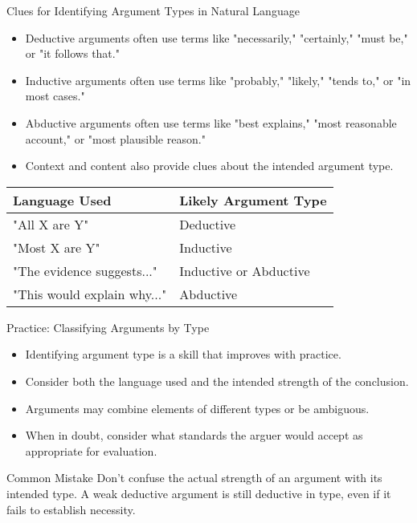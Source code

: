 \documentclass{beamer}
\begin{document}
\begin{frame}{Clues for Identifying Argument Types in Natural Language}
    \begin{itemize}
        \item Deductive arguments often use terms like "necessarily," "certainly," "must be," or "it follows that."
        \item Inductive arguments often use terms like "probably," "likely," "tends to," or "in most cases."
        \item Abductive arguments often use terms like "best explains," "most reasonable account," or "most plausible reason."
        \item Context and content also provide clues about the intended argument type.
    \end{itemize}
    
    \begin{table}
        \centering
        \begin{tabular}{|l|l|}
            \hline
            \textbf{Language Used} & \textbf{Likely Argument Type} \\
            \hline
            "All X are Y" & Deductive \\
            "Most X are Y" & Inductive \\
            "The evidence suggests..." & Inductive or Abductive \\
            "This would explain why..." & Abductive \\
            \hline
        \end{tabular}
    \end{table}
\end{frame}

\begin{frame}{Practice: Classifying Arguments by Type}
    \begin{itemize}
        \item Identifying argument type is a skill that improves with practice.
        \item Consider both the language used and the intended strength of the conclusion.
        \item Arguments may combine elements of different types or be ambiguous.
        \item When in doubt, consider what standards the arguer would accept as appropriate for evaluation.
    \end{itemize}
    
    \begin{alertblock}{Common Mistake}
        Don't confuse the actual strength of an argument with its intended type. A weak deductive argument is still deductive in type, even if it fails to establish necessity.
    \end{alertblock}
\end{frame}
\end{document}
